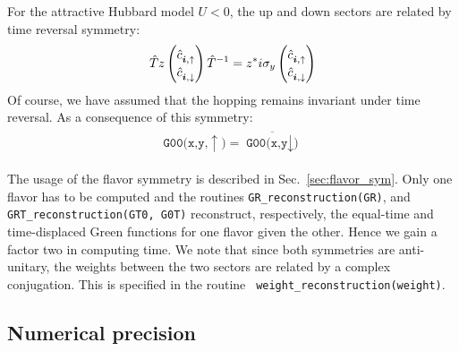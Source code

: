 For   the  attractive  Hubbard  model  $U<0$,  the  up  and  down  sectors  are  related  by  time  reversal  symmetry:   
\begin{equation}
\hat{T}  z  
\begin{pmatrix}
  \hat{c}^{\phantom\dagger}_{\ve{i},\uparrow}  \\
    \hat{c}^{\phantom\dagger}_{\ve{i},\downarrow} 
\end{pmatrix}
 \hat{T }^{-1}    =  z^{*}    i  \sigma_y  
\begin{pmatrix}
  \hat{c}^{\phantom\dagger}_{\ve{i},\uparrow}  \\
    \hat{c}^{\phantom\dagger}_{\ve{i},\downarrow} 
\end{pmatrix}
\end{equation}
Of  course,   we  have  assumed  that  the  hopping    remains  invariant    under  time  reversal.    As  a  consequence of  this  symmetry: 
\begin{align}
\begin{aligned}
 \texttt{G00(x,y,}\uparrow\texttt{)}     =  \overline{ \texttt{G00(x,y}\downarrow\texttt{)}  } 
\end{aligned}
\end{align}

The  usage  of  the  flavor   symmetry  is  described  in   Sec.~\ref{sec:flavor_sym}.   Only  one  flavor  has  to be   computed  and  the   routines
\texttt{GR\_reconstruction(GR)}, and \texttt{GRT\_reconstruction(GT0, G0T)}  reconstruct, respectively,    the  equal-time  and    time-displaced  Green  functions for one flavor  given the  other.   Hence we  gain a  factor  two  in  computing time.   We  note  that  since  both  symmetries  are  anti-unitary, the  weights   between  the  two  sectors  are  related  by a  complex  conjugation.  This is  specified in the routine    \texttt{ weight\_reconstruction(weight)}.

\subsection{Numerical precision}\label{sec:prec_spin}

